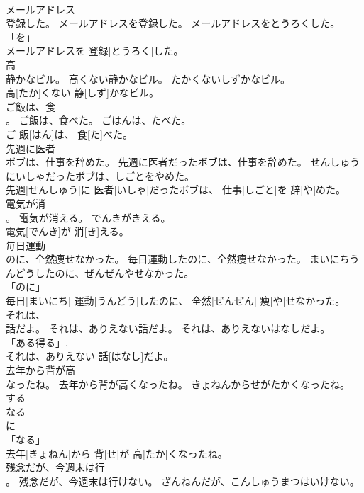 \documentclass[8pt]{extreport}
\begin{document}
\begin{CJK}{UTF8}{min}
\\	メールアドレス
\\	登録した。	メールアドレスを登録した。	メールアドレスをとうろくした。	
\\	「を」 
\\	メールアドレスを 登録[とうろく]した。		
\\	高
\\	静かなビル。	高くない静かなビル。	たかくないしずかなビル。	
\\	高[たか]くない 静[しず]かなビル。		
\\	ご飯は、食
\\	。	ご飯は、食べた。	ごはんは、たべた。	
\\	ご 飯[はん]は、 食[た]べた。		
\\	先週に医者
\\	ボブは、仕事を辞めた。	先週に医者だったボブは、仕事を辞めた。	せんしゅうにいしゃだったボブは、しごとをやめた。	
\\	先週[せんしゅう]に 医者[いしゃ]だったボブは、 仕事[しごと]を 辞[や]めた。		
\\	電気が消
\\	。	電気が消える。	でんきがきえる。	
\\	電気[でんき]が 消[き]える。		
\\	毎日運動
\\	のに、全然痩せなかった。	毎日運動したのに、全然痩せなかった。	まいにちうんどうしたのに、ぜんぜんやせなかった。	
\\	「のに」 
\\	毎日[まいにち] 運動[うんどう]したのに、 全然[ぜんぜん] 痩[や]せなかった。		
\\	それは、
\\	話だよ。	それは、ありえない話だよ。	それは、ありえないはなしだよ。	
\\	「ある得る」, 
\\	それは、ありえない 話[はなし]だよ。		
\\	去年から背が高
\\	なったね。	去年から背が高くなったね。	きょねんからせがたかくなったね。	
\\	する 
\\	なる 
\\	に 
\\	「なる」 
\\	去年[きょねん]から 背[せ]が 高[たか]くなったね。		
\\	残念だが、今週末は行
\\	。	残念だが、今週末は行けない。	ざんねんだが、こんしゅうまつはいけない。	

\end{CJK}
\end{document}
